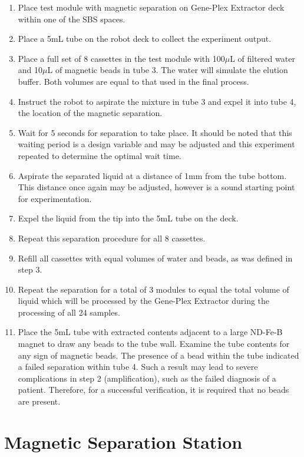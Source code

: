 \begin{enumerate}
	\item Place test module with magnetic separation on Gene-Plex Extractor deck within one of the SBS spaces.
	\item Place a 5mL tube on the robot deck to collect the experiment output.
	\item Place a full set of 8 cassettes in the test module with 100$\mu$L of filtered water and 10$\mu$L of magnetic beads in tube 3. The water will simulate the elution buffer. Both volumes are equal to that used in the final process.
	\item Instruct the robot to aspirate the mixture in tube 3 and expel it into tube 4, the location of the magnetic separation.
	\item Wait for 5 seconds for separation to take place. It should be noted that this waiting period is a design variable and may be adjusted and this experiment repeated to determine the optimal wait time.
	\item Aspirate the separated liquid at a distance of 1mm from the tube bottom. This distance once again may be adjusted, however is a sound starting point for experimentation.
	\item Expel the liquid from the tip into the 5mL tube on the deck.
	\item Repeat this separation procedure for all 8 cassettes.
	\item Refill all cassettes with equal volumes of water and beads, as was defined in step 3.
	\item Repeat the separation for a total of 3 modules to equal the total volume of liquid which will be processed by the Gene-Plex Extractor during the processing of all 24 samples.
	\item Place the 5mL tube with extracted contents adjacent to a large ND-Fe-B magnet to draw any beads to the tube wall. Examine the tube contents for any sign of magnetic beads. The presence of a bead within the tube indicated a failed separation within tube 4. Such a result may lead to severe complications in step 2 (amplification), such as the failed diagnosis of a patient. Therefore, for a successful verification, it is required that no beads are present.
\end{enumerate}

\section{Magnetic Separation Station}

